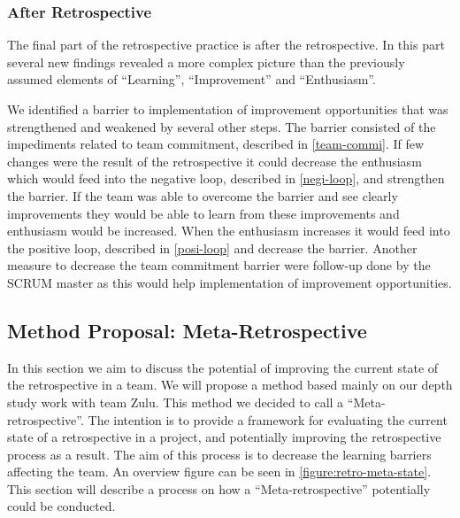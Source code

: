 \subsubsection{After Retrospective}
The final part of the retrospective practice is after the retrospective. In this part several new findings revealed a more complex picture than the previously assumed elements of ``Learning'', ``Improvement'' and ``Enthusiasm''.

We identified a barrier to implementation of improvement opportunities that was strengthened and weakened by several other steps. The barrier consisted of the impediments related to team commitment, described in \autoref{team-commi}. If few changes were the result of the retrospective it could decrease the enthusiasm which would feed into the negative loop, described in \autoref{negi-loop}, and strengthen the barrier. If the team was able to overcome the barrier and see clearly improvements they would be able to learn from these improvements and enthusiasm would be increased. When the enthusiasm increases it would feed into the positive loop, described in \autoref{posi-loop} and decrease the barrier. Another measure to decrease the team commitment barrier were follow-up done by the SCRUM master as this would help implementation of improvement opportunities. 

\subsection{Method Proposal: Meta-Retrospective}
\label{section:Method-propsal}
In this section we aim to discuss the potential of improving the current state of the retrospective in a team. We will propose a method based mainly on our depth study work with team Zulu. This method we decided to call a ``Meta-retrospective''. The intention is to provide a framework for evaluating the current state of a retrospective in a project, and potentially improving the retrospective process as a result. The aim of this process is to decrease the learning barriers affecting the team. An overview figure can be seen in \autoref{figure:retro-meta-state}. This section will describe a process on how a ``Meta-retrospective'' potentially could be conducted.

